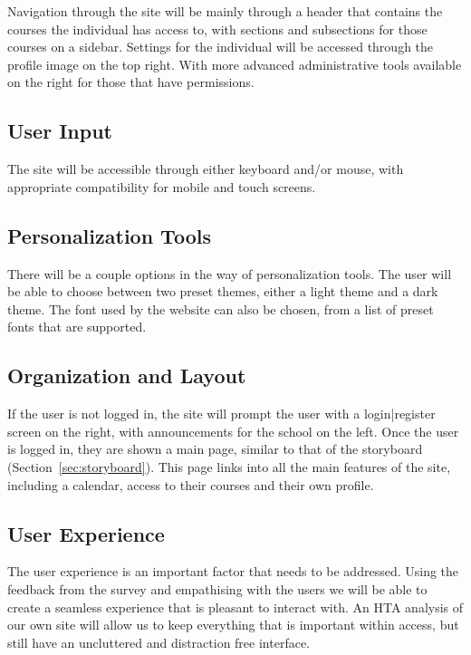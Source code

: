 \documentclass[12pt]{article}
\begin{document}
    Navigation through the site will be mainly through a header that contains the courses the individual has access to, with sections and subsections for those courses on a sidebar.
    Settings for the individual will be accessed through the profile image on the top right.
    With more advanced administrative tools available on the right for those that have permissions.

    \subsection{User Input}\label{subsec:user-input}

    The site will be accessible through either keyboard and/or mouse, with appropriate compatibility for mobile and touch screens.

    \subsection{Personalization Tools}\label{subsec:personalization-tools}

    There will be a couple options in the way of personalization tools.
    The user will be able to choose between two preset themes, either a light theme and a dark theme.
    The font used by the website can also be chosen, from a list of preset fonts that are supported.

    \subsection{Organization and Layout}\label{subsec:organization-and-layout}

    If the user is not logged in, the site will prompt the user with a login|register screen on the right, with announcements for the school on the left.
    Once the user is logged in, they are shown a main page, similar to that of the storyboard (Section\ \ref{sec:storyboard}).
    This page links into all the main features of the site, including a calendar, access to their courses and their own profile.

    \subsection{User Experience}\label{subsec:user-experience}

    The user experience is an important factor that needs to be addressed.
    Using the feedback from the survey and empathising with the users we will be able to create a seamless experience that is pleasant to interact with.
    An HTA analysis of our own site will allow us to keep everything that is important within access, but still have an uncluttered and distraction free interface.
\end{document}

